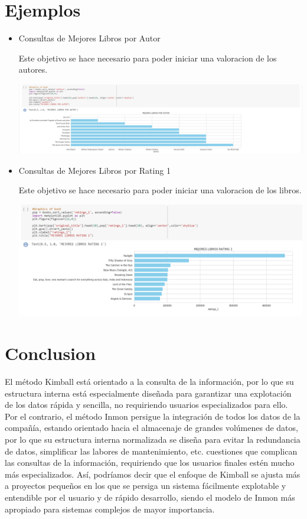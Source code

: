 \documentclass[preprint,12pt]{elsarticle}
\begin{document}
\section{Ejemplos}
\begin{itemize}
\item Consultas de Mejores Libros por Autor 

Este objetivo se hace necesario para poder iniciar una valoracion de los autores.

\begin {center}
\includegraphics[scale= 0.40]{./Imagenes/mejores_libros_p_autor.png}
\end {center}


\item Consultas de Mejores Libros por Rating 1

Este objetivo se hace necesario para poder iniciar una valoracion de los libros.

\begin {center}
\includegraphics[scale= 0.50]{./Imagenes/mejores_libros_rating_1.png}
\end {center}


\end{itemize}


\section{Conclusion}
El método Kimball está orientado a la consulta de la información, por lo que su estructura interna está especialmente diseñada para garantizar una explotación de los datos rápida y sencilla, no requiriendo usuarios especializados para ello. Por el contrario, el método Inmon persigue la integración de todos los datos de la compañía, estando orientado hacia el almacenaje de grandes volúmenes de datos, por lo que su estructura interna normalizada se diseña para evitar la redundancia de datos, simplificar las labores de mantenimiento, etc. cuestiones que complican las consultas de la información, requiriendo que los usuarios finales estén mucho más especializados.
Así, podríamos decir que el enfoque de Kimball se ajusta más a proyectos pequeños en los que se persiga un sistema fácilmente explotable y entendible por el usuario y de rápido desarrollo, siendo el modelo de Inmon más apropiado para sistemas complejos de mayor importancia.
\end{document}
